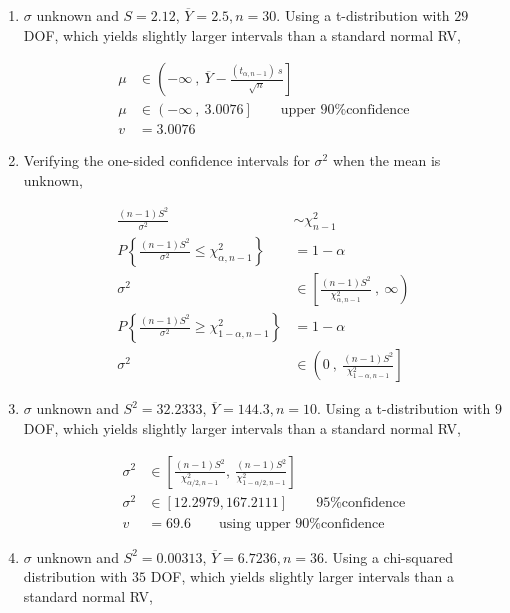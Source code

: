 \begin{enumerate}
	
	\item  $ \sigma $ unknown and $ S = 2.12 $, $ \overline{Y} = 2.5, n = 30$. Using a t-distribution with $ 29 $ DOF, which yields slightly larger intervals than a standard normal RV,
	
		\begin{align}
			\mu &\in \left(-\infty\ ,\  \overline{Y} - \frac{(t_{\alpha, n-1})\ s}{\sqrt{n}} \right] \nonumber \\
			\mu &\in \left(-\infty\ ,\ 3.0076  \right] \qquad \text{upper 90\% confidence} \nonumber \\
			v &= 3.0076
		\end{align}
	
	
	\item  Verifying the one-sided confidence intervals for $ \sigma^2 $ when the mean is unknown,
	
		\begin{align}
			\frac{(n-1)S^2}{\sigma^2} &\sim \chi^2_{n-1} \nonumber \\
			P \left\{ \frac{(n-1)S^2}{\sigma^2} \leq \chi^2_{\alpha, n-1} \right\} &= 1 - \alpha \nonumber \\
			\sigma^2 &\in \left[ \frac{(n-1)S^2}{\chi^2_{\alpha, n-1}}\ ,\ \infty \right) \\
			P \left\{ \frac{(n-1)S^2}{\sigma^2} \geq \chi^2_{1 - \alpha, n-1} \right\} &= 1 - \alpha \nonumber \\
			\sigma^2 &\in \left(0\ ,\ \frac{(n-1)S^2}{\chi^2_{1-\alpha, n-1}} \right]
		\end{align}
	
	
	\item  $ \sigma $ unknown and $ S^2 = 32.2333 $, $ \overline{Y} = 144.3, n = 10$. Using a t-distribution with $ 9 $ DOF, which yields slightly larger intervals than a standard normal RV,
	
		\begin{align}
			\sigma^2 &\in \left[\frac{(n-1)S^2}{\chi^2_{\alpha/2, n-1}} ,\  \frac{(n-1)S^2}{\chi^2_{1 -\alpha/2, n-1}} \right] \nonumber \\
			\sigma^2 &\in \left[ 12.2979, 167.2111 \right] \qquad \text{95\% confidence} \nonumber \\
			v &= 69.6 \qquad \text{using upper 90\% confidence}
		\end{align}
	
	
	\item  $ \sigma $ unknown and $ S^2 = 0.00313 $, $ \overline{Y} = 6.7236, n = 36$. Using a chi-squared distribution with $ 35 $ DOF, which yields slightly larger intervals than a standard normal RV,
	

\end{enumerate}
